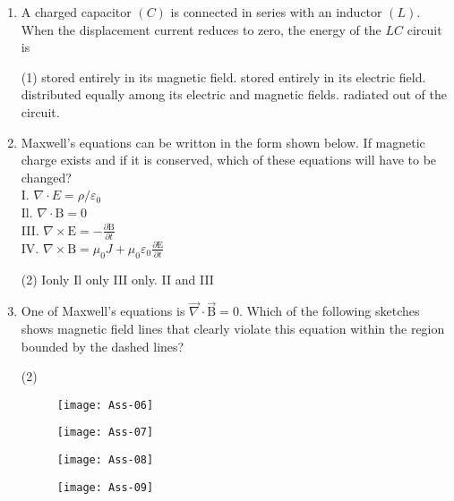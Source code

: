\begin{enumerate}
\begin{tasks}
	\end{tasks}
\item A charged capacitor $(C)$ is connected in series with an inductor $(L)$. When the displacement current reduces to zero, the energy of the $L C$ circuit is
	 \begin{tasks}(1)
		\task[\textbf{a.}]stored entirely in its magnetic field.
		\task[\textbf{b.}] stored entirely in its electric field.
		\task[\textbf{c.}]distributed equally among its electric and magnetic fields.
		\task[\textbf{d.}]  radiated out of the circuit.
	\end{tasks}
\item 	Maxwell's equations can be writton in the form shown below. If magnetic charge exists and if it is conserved, which of these equations will have to be changed?\\
I. $\nabla \cdot E=\rho / \varepsilon_{0}$\\
Il. $\nabla \cdot \mathrm{B}=0$\\
III. $\nabla \times \mathrm{E}=-\frac{\partial \mathrm{B}}{\partial t}$\\
IV. $\nabla \times \mathrm{B}=\mu_{0} J+\mu_{0} \varepsilon_{0} \frac{\partial \mathrm{E}}{\partial t}$
	 \begin{tasks}(2)
		\task[\textbf{a.}] Ionly
		\task[\textbf{b.}]Il only
		\task[\textbf{c.}]III only.
		\task[\textbf{d.}]II and III 
	\end{tasks}
\item One of Maxwell's equations is $\vec{\nabla} \cdot \overrightarrow{\mathrm{B}}=0$. Which of the following sketches shows magnetic field lines that clearly violate this equation within the region bounded by the dashed lines?	 
  \begin{tasks}(2)
 	\task[\textbf{a.}]
 	\begin{figure}[H]
 		\centering
 		\texttt{[image: Ass-06]}
 	\end{figure}
 	\task[\textbf{b.}]	\begin{figure}[H]
 		\centering
 		\texttt{[image: Ass-07]}
 	\end{figure}
 	\task[\textbf{c.}]	\begin{figure}[H]
 		\centering
 		\texttt{[image: Ass-08]}
 	\end{figure}
 	\task[\textbf{d.}] 	\begin{figure}[H]
 		\centering
 		\texttt{[image: Ass-09]}
 	\end{figure}
 \end{tasks}
	
	
	
	
	
	
	
	
	
	
	
	
	
	
	
	
	
	
	
	
\end{enumerate}
